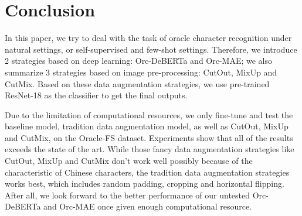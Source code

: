 \documentclass{article}
\begin{document}
\section{Conclusion}

In this paper, we try to deal with the task of oracle character recognition under natural settings, or self-supervised and few-shot settings. Therefore, we introduce 2 strategies based on deep learning: Orc-DeBERTa and Orc-MAE; we also summarize 3 strategies based on image pre-processing: CutOut, MixUp and CutMix. Based on these data augmentation strategies, we use pre-trained ResNet-18 as the classifier to get the final outputs.

Due to the limitation of computational resources, we only fine-tune and test the baseline model, tradition data augmentation model, as well as CutOut, MixUp and CutMix, on the Oracle-FS dataset. Experiments show that all of the results exceeds the state of the art. While those fancy data augmentation strategies like CutOut, MixUp and CutMix don't work well possibly because of the characteristic of Chinese characters, the tradition data augmentation strategies works best, which includes random padding, cropping and horizontal flipping. After all, we look forward to the better performance of our untested Orc-DeBERTa and Orc-MAE once given enough computational resource.



\end{document}
